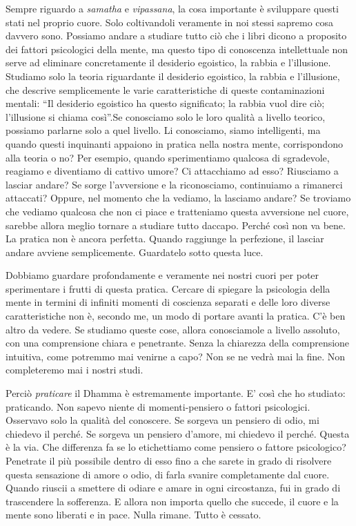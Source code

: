 Sempre riguardo a \emph{samatha} e \emph{vipassana}, la cosa importante
è sviluppare questi stati nel proprio cuore. Solo coltivandoli veramente
in noi stessi sapremo cosa davvero sono. Possiamo andare a studiare
tutto ciò che i libri dicono a proposito dei fattori psicologici della
mente, ma questo tipo di conoscenza intellettuale non serve ad eliminare
concretamente il desiderio egoistico, la rabbia e l'illusione. Studiamo
solo la teoria riguardante il desiderio egoistico, la rabbia e
l'illusione, che descrive semplicemente le varie caratteristiche di
queste contaminazioni mentali: ``Il desiderio egoistico ha questo
significato; la rabbia vuol dire ciò; l'illusione si chiama così''.Se
conosciamo solo le loro qualità a livello teorico, possiamo parlarne
solo a quel livello. Li conosciamo, siamo intelligenti, ma quando questi
inquinanti appaiono in pratica nella nostra mente, corrispondono alla
teoria o no? Per esempio, quando sperimentiamo qualcosa di sgradevole,
reagiamo e diventiamo di cattivo umore? Ci attacchiamo ad esso?
Riusciamo a lasciar andare? Se sorge l'avversione e la riconosciamo,
continuiamo a rimanerci attaccati? Oppure, nel momento che la vediamo,
la lasciamo andare? Se troviamo che vediamo qualcosa che non ci piace e
tratteniamo questa avversione nel cuore, sarebbe allora meglio tornare a
studiare tutto daccapo. Perché così non va bene. La pratica non è ancora
perfetta. Quando raggiunge la perfezione, il lasciar andare avviene
semplicemente. Guardatelo sotto questa luce.

Dobbiamo guardare profondamente e veramente nei nostri cuori per poter
sperimentare i frutti di questa pratica. Cercare di spiegare la
psicologia della mente in termini di infiniti momenti di coscienza
separati e delle loro diverse caratteristiche non è, secondo me, un modo
di portare avanti la pratica. C'è ben altro da vedere. Se studiamo
queste cose, allora conosciamole a livello assoluto, con una
comprensione chiara e penetrante. Senza la chiarezza della comprensione
intuitiva, come potremmo mai venirne a capo? Non se ne vedrà mai la
fine. Non completeremo mai i nostri studi.

Perciò \emph{praticare} il Dhamma è estremamente importante. E' così che
ho studiato: praticando. Non sapevo niente di momenti-pensiero o fattori
psicologici. Osservavo solo la qualità del conoscere. Se sorgeva un
pensiero di odio, mi chiedevo il perché. Se sorgeva un pensiero d'amore,
mi chiedevo il perché. Questa è la via. Che differenza fa se lo
etichettiamo come pensiero o fattore psicologico? Penetrate il più
possibile dentro di esso fino a che sarete in grado di risolvere questa
sensazione di amore o odio, di farla svanire completamente dal cuore.
Quando riuscii a smettere di odiare e amare in ogni circostanza, fui in
grado di trascendere la sofferenza. E allora non importa quello che
succede, il cuore e la mente sono liberati e in pace. Nulla rimane.
Tutto è cessato.

